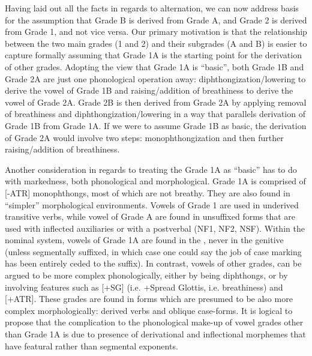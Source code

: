 \documentclass[output=paper,newtxmath,modfonts,nonflat,draftmode]{langsci/langscibook}
\begin{document}
Having laid out all the facts in regards to  alternation, we can now address basis for the assumption that Grade B is derived from Grade A, and Grade 2 is derived from Grade 1, and not vice versa. Our primary motivation is that the relationship between the two main grades (1 and 2) and their subgrades (A and B) is easier to capture formally assuming that Grade 1A is the starting point for the derivation of other grades. Adopting the view that Grade 1A is “basic”, both Grade 1B and Grade 2A are just one phonological operation away: diphthongization/lowering to derive the vowel of Grade 1B and raising/addition of breathiness to derive the vowel of Grade 2A. Grade 2B is then derived from Grade 2A by applying removal of breathiness and diphthongization/lowering in a way that parallels derivation of Grade 1B from Grade 1A. If we were to assume Grade 1B as basic, the derivation of Grade 2A would involve two steps: monophthongization and then further raising/addition of breathiness. 

Another consideration in regards to treating the Grade 1A as “basic” has to do with markedness, both phonological and morphological. Grade 1A is comprised of [-ATR] monophthongs, most of which are not breathy. They are also found in “simpler” morphological environments. Vowels of Grade 1 are used in underived transitive verbs, while vowel of Grade A are found in unsuffixed forms that are used with inflected auxiliaries or with a postverbal  (NF1, NF2, NSF). Within the nominal system, vowels of Grade 1A are found in the , never in the genitive (unless segmentally suffixed, in which case one could say the job of case marking has been entirely ceded to the suffix). In contrast, vowels of other grades, can be argued to be more complex phonologically, either by being diphthongs, or by involving features such as [+SG] (i.e. +Spread Glottis, i.e. breathiness) and [+ATR]. These grades are found in forms which are presumed to be also more complex morphologically: derived verbs and oblique case-forms. It is logical to propose that the complication to the phonological make-up of vowel grades other than Grade 1A is due to presence of derivational and inflectional morphemes that have featural rather than segmental exponents.   
\end{document}
